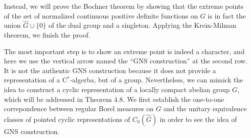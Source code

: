 \documentclass[a4paper]{article}
\begin{document}
Instead, we will prove the Bochner theorem by showing that the extreme points of the set of normalized continuous positive definite functions on $G$ is in fact the union $\hat G\cup\{0\}$ of the dual group and a singleton.
Applying the Krein-Milman theorem, we finish the proof.

The most important step is to show an extreme point is indeed a character, and here we use the vertical arrow named the ``GNS construction'' at the second row.
It is not the authentic GNS construction because it does not provide a representation of a C$^*$-algerba, but of a group.
Nevertheless, we can mimick the idea to construct a cyclic representation of a locally compact abelian group $G$, which will be addressed in Theorem 4.8.
We first establish the one-to-one correpondence between regular Borel measures on $\hat G$ and the unitary equivalence classes of pointed cyclic representations of $C_0(\hat G)$ in order to see the idea of GNS construction.
\end{document}
